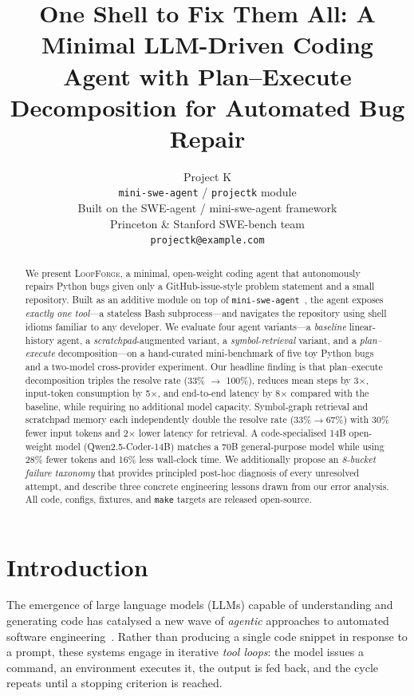 \documentclass[11pt]{article}
\title{One Shell to Fix Them All: A Minimal LLM-Driven Coding Agent
       with Plan--Execute Decomposition for Automated Bug Repair}
\author{Project K \\
  \texttt{mini-swe-agent} / \texttt{projectk} module \\
  Built on the SWE-agent / mini-swe-agent framework \\
  Princeton \& Stanford SWE-bench team \\
  \texttt{projectk@example.com}}
\begin{document}
\maketitle

\begin{abstract}
We present \textsc{LoopForge}, a minimal, open-weight coding agent that
autonomously repairs Python bugs given only a GitHub-issue-style problem
statement and a small repository.  Built as an additive module on top of
\texttt{mini-swe-agent}~\citep{yang2024sweagent}, the agent exposes
\emph{exactly one tool}---a stateless Bash subprocess---and navigates the
repository using shell idioms familiar to any developer.  We evaluate four
agent variants---a \emph{baseline} linear-history agent, a
\emph{scratchpad}-augmented variant, a \emph{symbol-retrieval} variant, and
a \emph{plan--execute} decomposition---on a hand-curated mini-benchmark of
five toy Python bugs and a two-model cross-provider experiment.  Our headline
finding is that plan--execute decomposition triples the resolve rate (33\%
$\to$ 100\%), reduces mean steps by 3$\times$, input-token consumption by
5$\times$, and end-to-end latency by 8$\times$ compared with the baseline,
while requiring no additional model capacity.  Symbol-graph retrieval and
scratchpad memory each independently double the resolve rate (33\%$\to$67\%)
with 30\% fewer input tokens and 2$\times$ lower latency for retrieval.  A
code-specialised 14B open-weight model (Qwen2.5-Coder-14B) matches a 70B
general-purpose model while using 28\% fewer tokens and 16\% less wall-clock
time.  We additionally propose an \emph{8-bucket failure taxonomy} that
provides principled post-hoc diagnosis of every unresolved attempt, and
describe three concrete engineering lessons drawn from our error analysis.
All code, configs, fixtures, and \texttt{make} targets are released
open-source.
\end{abstract}

\section{Introduction}
\label{sec:intro}

The emergence of large language models (LLMs) capable of understanding and
generating code has catalysed a new wave of \emph{agentic} approaches to
automated software engineering~\citep{yang2024sweagent,jimenez2024swebench}.
Rather than producing a single code snippet in response to a prompt, these
systems engage in iterative \emph{tool loops}: the model issues a command, an
environment executes it, the output is fed back, and the cycle repeats until
a stopping criterion is reached.
\end{document}
